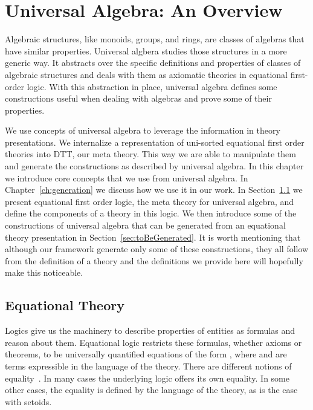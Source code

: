 \chapter{Universal Algebra: An Overview}
\label{ch:ualgebra}
Algebraic structures, like monoids, groups, and rings, are classes of algebras that have similar properties. Universal algbera studies those structures in a more generic way. It abstracts over the specific definitions and properties of classes of algebraic structures and deals with them as axiomatic theories in equational first-order logic. With this abstraction in place, universal algebra defines some constructions useful when dealing with algebras and prove some of their properties.

We use concepts of universal algebra to leverage the information in theory presentations. We internalize a representation of uni-sorted equational first order theories into DTT, our meta theory. This way we are able to manipulate them and generate the constructions as described by universal algebra. In this chapter we introduce core concepts that we use from universal algebra. In Chapter~\ref{ch:generation} we discuss how we use it in our work. In Section~\ref{sec:eqtheory} we present equational first order logic, the meta theory for universal algebra, and define the components of a theory in this logic. We then introduce some of the constructions of universal algebra that can be generated from an equational theory presentation in Section~\ref{sec:toBeGenerated}. It is worth mentioning that although our framework generate only some of these constructions, they all follow from the definition of a theory and the definitions we provide here will hopefully make this noticeable.   

\section{Equational Theory}
\label{sec:eqtheory}
Logics give us the machinery to describe properties of entities as formulas and reason about them.  
Equational logic restricts these formulas, whether axioms or theorems, to be universally quantified equations of the form , where  and   are terms expressible in the language of the theory. There are different notions of equality~\cite{oneThingSame2008, equalityInTPs2015}. In many cases the underlying logic offers its own equality. In some other cases, the equality is defined by the language of the theory, as is the case with setoids. 


